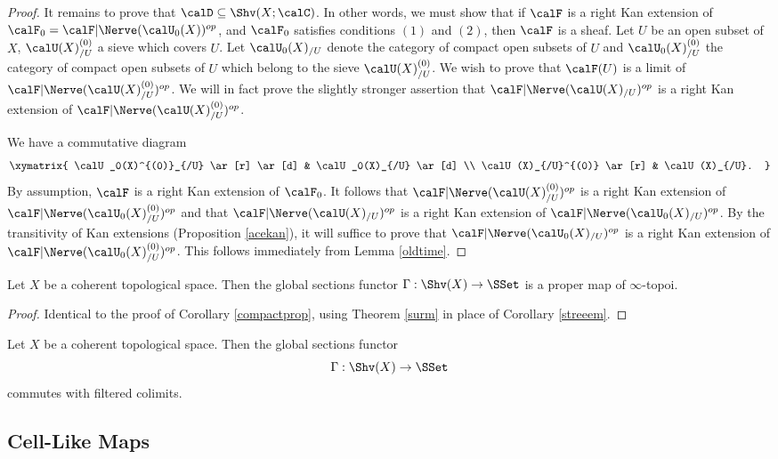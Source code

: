 \begin{proof}
It remains to prove that $\calD \subseteq \Shv(X;\calC)$. In other words, we must show that
if $\calF$ is a right Kan extension of $\calF_0 = \calF | \Nerve(\calU_0(X))^{op}$, and
$\calF_0$ satisfies conditions $(1)$ and $(2)$, then $\calF$ is a sheaf. Let $U$ be an open subset of $X$, $\calU(X)_{/U}^{(0)}$ a sieve which covers $U$. Let $\calU_0(X)_{/U}$ denote the category of compact open subsets of $U$ and $\calU_0(X)^{(0)}_{/U}$ the category of compact
open subsets of $U$ which belong to the sieve $\calU(X)_{/U}^{(0)}$. We wish to prove
that $\calF(U)$ is a limit of $\calF | \Nerve(\calU(X)_{/U}^{(0)})^{op}$. We will in fact prove the slightly stronger assertion that $\calF | \Nerve (\calU(X)_{/U})^{op}$ is a right Kan extension of 
$\calF | \Nerve( \calU(X)_{/U}^{(0)})^{op}$.

We have a commutative diagram
$$ \xymatrix{ \calU_0(X)^{(0)}_{/U} \ar[r] \ar[d] & \calU_0(X)_{/U} \ar[d] \\
\calU(X)_{/U}^{(0)} \ar[r] & \calU(X)_{/U}. }$$
By assumption, $\calF$ is a right Kan extension of $\calF_0$. It follows that
$\calF | \Nerve (\calU(X)_{/U}^{(0)})^{op}$ is a right Kan extension of
$\calF | \Nerve (\calU_0(X)_{/U}^{(0)})^{op}$ and that
$\calF | \Nerve (\calU(X)_{/U})^{op}$ is a right Kan extension of
$\calF | \Nerve (\calU_0(X)_{/U})^{op}$. By the transitivity of Kan extensions
(Proposition \ref{acekan}), it will suffice to prove that $\calF | \Nerve(\calU_0(X)_{/U})^{op}$ is a right
Kan extension of $\calF | \Nerve (\calU_0(X)^{(0)}_{/U})^{op}$. This follows immediately
from Lemma \ref{oldtime}.
\end{proof}

\begin{corollary}\label{applyZR}
Let $X$ be a coherent topological space. Then the global sections functor
$\Gamma: \Shv(X) \rightarrow \SSet$ is a proper map of $\infty$-topoi.
\end{corollary}

\begin{proof}
Identical to the proof of Corollary \ref{compactprop}, using
Theorem \ref{surm} in place of Corollary \ref{streeem}.
\end{proof} 

\begin{corollary}
Let $X$ be a coherent topological space. Then the global sections functor
$$ \Gamma: \Shv(X) \rightarrow \SSet$$ commutes with filtered colimits.
\end{corollary}

\subsection{Cell-Like Maps}\label{celluj}

